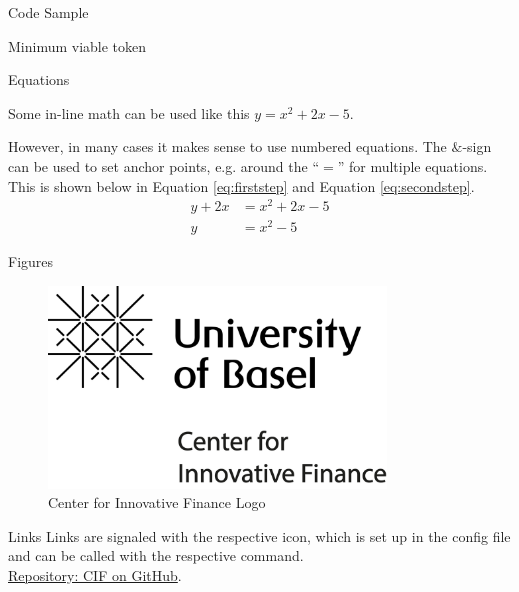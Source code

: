 \documentclass[handout]{beamer}
\begin{document}


\begin{frame}{Code Sample}
	\begin{samplecode}{Minimum viable token}
		
	\end{samplecode}
\end{frame}


\begin{frame}{Equations}

Some in-line math can be used like this $y=x^2+2x-5$. \\ \vspace{1em}

However, in many cases it makes sense to use numbered equations. The $\&$-sign can be used to set anchor points, e.g. around the ``$=$'' for multiple equations. This is shown below in Equation \eqref{eq:firststep} and Equation \eqref{eq:secondstep}.
	\begin{align}
		y + 2x &= x^2+2x-5 \label{eq:firststep}\\
		y &= x^2-5 \label{eq:secondstep}
	\end{align}
\end{frame}

\begin{frame}{Figures}
	\begin{figure}
		\center
		\includegraphics[width=0.8\textwidth]{../config/logo_cif}	
		\caption{Center for Innovative Finance Logo}
		\label{fig:logo}
	\end{figure}
\end{frame}

\begin{frame}{Links}
		Links are signaled with the respective icon, which is set up in the config file and can be called with the respective command.\\
		
		\link \href{https://github.com/cifunibas}{Repository: CIF on GitHub}.
		
\end{frame}
\end{document}
